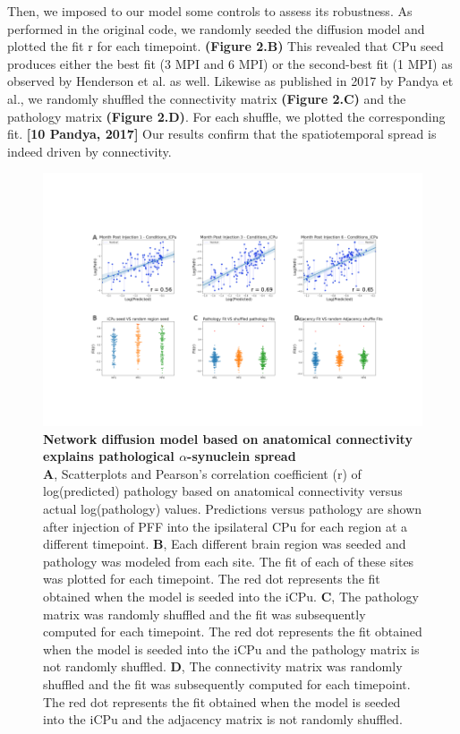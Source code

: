 \begin{table}[h!]
\begin{center}
\begin{tabular}{|l|c|c|}
      
    \end{tabular}
  \end{center}
\end{table}

Then, we imposed to our model some controls to assess its robustness. As performed in the original code, we randomly seeded the diffusion model and plotted the fit r for each timepoint. \textbf{(Figure 2.B)} This revealed that CPu seed produces either the best fit (3 MPI and 6 MPI) or the second-best fit (1 MPI) as observed by Henderson et al. as well. 
Likewise as published in 2017 by Pandya et al., we randomly shuffled the connectivity matrix \textbf{(Figure 2.C)} and the pathology matrix \textbf{(Figure 2.D)}. For each shuffle, we plotted the corresponding fit. \textbf{[10 Pandya, 2017]} Our results confirm that the spatiotemporal spread is indeed driven by connectivity.


\begin{figure}[h]
 
    \includegraphics[width = \linewidth]{Figures/Fig2.pdf}
    \centering
    \caption{\textbf{Network diffusion model based on anatomical connectivity explains pathological $\alpha$-synuclein spread} \\
    \textbf{A}, Scatterplots and Pearson's correlation coefficient (r) of log(predicted) pathology based on anatomical connectivity versus actual log(pathology) values. Predictions versus pathology are shown after injection of PFF into the ipsilateral CPu for each region at a different timepoint.
    \textbf{B}, Each different brain region was seeded and pathology was modeled from each site. The fit of each of these sites was plotted for each timepoint. The red dot represents the fit obtained when the model is seeded into the iCPu. \textbf{C}, The pathology matrix was randomly shuffled and the fit was subsequently computed for each timepoint. The red dot represents the fit obtained when the model is seeded into the iCPu and the pathology matrix is not randomly shuffled. \textbf{D}, The connectivity matrix was randomly shuffled and the fit was subsequently computed for each timepoint. The red dot represents the fit obtained when the model is seeded into the iCPu and the adjacency matrix is not randomly shuffled.}
    \label{fig:fig1}
\end{figure}
    
